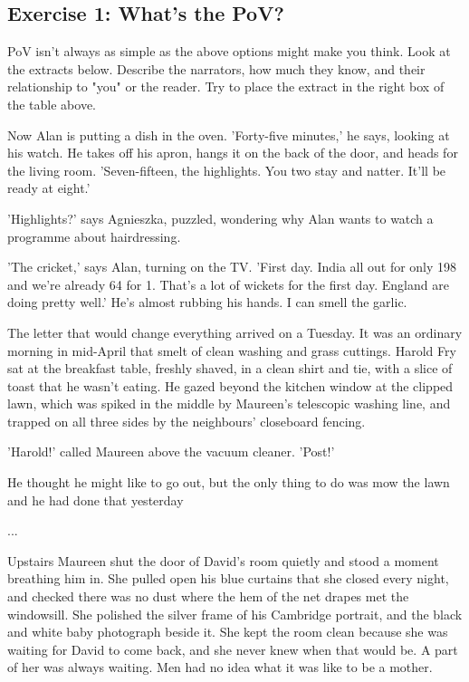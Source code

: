 \documentclass[11pt]{article}
\newenvironment{narrow}[2]{%
 \begin{list}{}{%
  \setlength{\topsep}{0pt}%
  \setlength{\leftmargin}{#1}%
  \setlength{\rightmargin}{#2}%
  \setlength{\listparindent}{\parindent}%
  \setlength{\itemindent}{\parindent}%
  \setlength{\parsep}{\parskip}%
 }%
\item[]}{\end{list}}
\begin{document}
\subsection*{Exercise 1: What's the PoV?}
\begin{narrow}{1.0cm}{1.0cm}
PoV isn't always as simple as the above options might make you think. Look at 
the extracts below. Describe the narrators, how much they know, and their 
relationship to "you" or the reader. Try to place the extract in the right 
box of the table above.
\end{narrow}
\begin{enumerate}
\item 
\begin{narrow}{1.0cm}{1.0cm}
Now Alan is putting a dish in the oven. 'Forty-five minutes,' he says, looking 
at his watch. He takes off his apron, hangs it on the back of the door, and 
heads for the living room. 'Seven-fifteen, the highlights. You two stay and 
natter. It'll be ready at eight.'

'Highlights?' says Agnieszka, puzzled, wondering why Alan wants to watch a 
programme about hairdressing.

'The cricket,' says Alan, turning on the TV. 'First day. India all out for 
only 198 and we're already 64 for 1. That's a lot of wickets for the first 
day. England are doing pretty well.' He's almost rubbing his hands. I can 
smell the garlic.
\end{narrow}


\item 
\begin{narrow}{1.0cm}{1.0cm}
The letter that would change everything arrived on a Tuesday. It was
 an ordinary morning in mid-April that smelt of clean washing and
 grass cuttings. Harold Fry sat at the breakfast table, freshly
 shaved, in a clean shirt and tie, with a slice of toast that he
 wasn't eating. He gazed beyond the kitchen window at the clipped
 lawn, which was spiked in the middle by Maureen's telescopic washing
 line, and trapped on all three sides by the neighbours' closeboard
 fencing.

'Harold!' called Maureen above the vacuum cleaner. 'Post!'

He thought he might like to go out, but the only thing to do was mow
 the lawn and he had done that yesterday

...

Upstairs Maureen shut the door of David's room quietly and stood a
 moment breathing him in. She pulled open his blue curtains that she
 closed every night, and checked there was no dust where the hem of
 the net drapes met the windowsill. She polished the silver frame of
 his Cambridge portrait, and the black and white baby photograph
 beside it. She kept the room clean because she was waiting for David
 to come back, and she never knew when that would be. A part of her
 was always waiting. Men had no idea what it was like to be a mother.


\end{narrow}
\end{enumerate}
\end{document}
